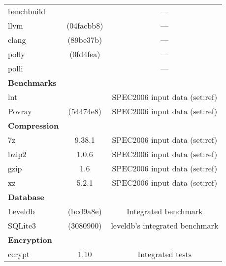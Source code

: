 \begin{longtable}{lcC} \toprule
        &  & \\
    \midrule
    benchbuild              &          & ---\\
    llvm                    & (04facbb8)              & ---\\
    clang                   & (89be37b)               & ---\\
    polly                   & (0fd4fea)               & ---\\
    polli                   &          & ---\\
    \midrule
    \textbf{Benchmarks}\\
    lnt                     &    & SPEC2006 input data (set:ref)\\
    Povray                  & (54474e8)               & SPEC2006 input data (set:ref)\\
    \midrule
    \textbf{Compression}\\
    7z                      & 9.38.1                  & SPEC2006 input data (set:ref)\\
    bzip2                   & 1.0.6                   & SPEC2006 input data (set:ref)\\
    gzip                    & 1.6                     & SPEC2006 input data (set:ref)\\
    xz                      & 5.2.1                   & SPEC2006 input data (set:ref)\\
    \midrule
    \textbf{Database}\\
    Leveldb                 & (bcd9a8e)               & Integrated benchmark\\
    SQLite3                 & (3080900)               & leveldb's integrated benchmark\\
    \midrule
    \textbf{Encryption}\\
    ccrypt                  & 1.10                    & Integrated tests\\

\end{longtable}
